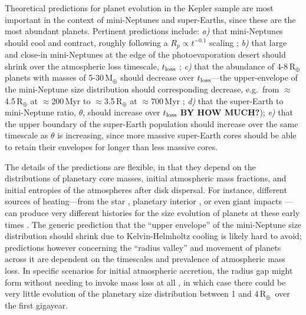 \documentclass[11pt,twocolumn,tighten]{aastex63}
\newcommand{\rearth}{{R$_\oplus$}}
\begin{document}
Theoretical predictions for planet evolution in the Kepler sample are
most important in the context of mini-Neptunes and super-Earths, since
these are the most abundant planets.  Pertinent predictions include:
{\it a)} that mini-Neptunes should cool and contract, roughly
following a $R_p \propto t^{-0.1}$ scaling \citep{Gupta_2019}; {\it
b)} that large and close-in mini-Neptunes at the edge of the
photoevaporation desert should shrink over the atmospheric loss
timescale, $t_{\rm loss}$ \citep{Owen_Lai_2018}; {\it c)} that the
abundance of 4-8\,R$_\oplus$ planets with masses of 5-30\,M$_\oplus$
should decrease over $t_{\rm loss}$---the upper-envelope of the
mini-Neptune size distribution should corresponding decrease,
e.g.~from $\approx$4.5\,R$_\oplus$ at $\approx$200\,Myr to
$\approx$3.5\,R$_\oplus$ at $\approx$700\,Myr
\citep[e.g.][]{Rogers_2021}; {\it d)} that the super-Earth to
mini-Neptune ratio, $\theta$, should increase over $t_{\rm loss}$
\citep[e.g.][]{Rogers_2021} {\bf BY HOW MUCH?}); {\it e)} that the
upper boundary of the super-Earth population should increase over the
same timescale as $\theta$ is increasing, since more massive
super-Earth cores should be able to retain their envelopes for longer
than less massive cores.

The details of the predictions are flexible, in that they depend on
the distributions of planetary core masses, initial atmospheric mass
fractions, and initial entropies of the atmospheres after disk
dispersal.  For instance, different sources of heating---from the star
\citep{Owen_Wu_2013,Lopez_Fortney_2014,Jin_2014}, planetary interior
\citep{Gupta_2019}, or even giant impacts
\citep{Biersteker_Schlichting_2019}---can produce very different
histories for the size evolution of planets at these early times
\citep[e.g.][]{Owen_2020}.  The generic prediction that the ``upper
envelope'' of the mini-Neptune size distribution should shrink due to
Kelvin-Helmholtz cooling is likely hard to avoid; predictions however
concerning the ``radius valley'' and movement of planets across it are
dependent on the timescales and prevalence of atmospheric mass loss.
In specific scenarios for initial atmospheric accretion, the radius
gap might form without needing to invoke mass loss at all
\citep{Lee_2022}, in which case there could be very little evolution
of the planetary size distribution between 1 and 4\,\rearth\ over the
first gigayear.
\end{document}
